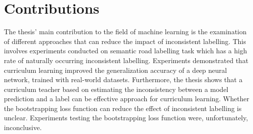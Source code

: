 \section{Contributions}
\label{sec:IntroContributions}
The thesis' main contribution to the field of machine learning is the examination of different approaches that can reduce the impact of inconsistent labelling. This involves experiments conducted on semantic road labelling task which has a high rate of naturally occurring inconsistent labelling. Experiments demonstrated that curriculum learning improved the generalization accuracy of a deep neural network, trained with real-world datasets. Furthermore, the thesis shows that a curriculum teacher based on estimating the inconsistency between a model prediction and a label can be effective approach for curriculum learning. Whether the bootstrapping loss function can reduce the effect of inconsistent labelling is unclear. Experiments testing the bootstrapping loss function were, unfortunately, inconclusive.